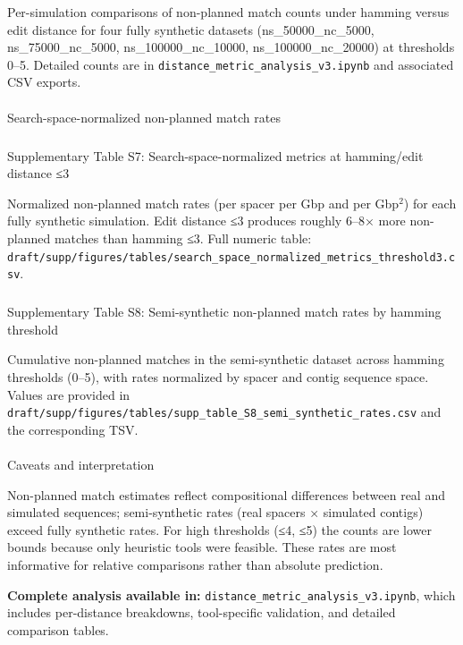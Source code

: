 \documentclass[
]{article}
\makeatletter
\let\oldparagraph\paragraph
\renewcommand{\paragraph}{
    \@ifstar
      \xxxParagraphStar
      \xxxParagraphNoStar
  }
\newcommand{\xxxParagraphStar}[1]{\oldparagraph*{#1}\mbox{}}
\newcommand{\xxxParagraphNoStar}[1]{\oldparagraph{#1}\mbox{}}
\let\oldsubparagraph\subparagraph
\renewcommand{\subparagraph}{
    \@ifstar
      \xxxSubParagraphStar
      \xxxSubParagraphNoStar
  }
\newcommand{\xxxSubParagraphStar}[1]{\oldsubparagraph*{#1}\mbox{}}
\newcommand{\xxxSubParagraphNoStar}[1]{\oldsubparagraph{#1}\mbox{}}
\makeatother
\begin{document}
Per-simulation comparisons of non-planned match counts under hamming
versus edit distance for four fully synthetic datasets
(ns\_50000\_nc\_5000, ns\_75000\_nc\_5000, ns\_100000\_nc\_10000,
ns\_100000\_nc\_20000) at thresholds 0--5. Detailed counts are in
\texttt{distance\_metric\_analysis\_v3.ipynb} and associated CSV
exports.

\paragraph{Search-space-normalized non-planned match
rates}\label{search-space-normalized-non-planned-match-rates}

\subparagraph{Supplementary Table S7: Search-space-normalized metrics at
hamming/edit distance ≤3}\label{tbl-supp-normalized-threshold3}

Normalized non-planned match rates (per spacer per Gbp and per
Gbp\(^2\)) for each fully synthetic simulation. Edit distance ≤3
produces roughly 6--8× more non-planned matches than hamming ≤3. Full
numeric table:
\texttt{draft/supp/figures/tables/search\_space\_normalized\_metrics\_threshold3.csv}.

\subparagraph{Supplementary Table S8: Semi-synthetic non-planned match
rates by hamming threshold}\label{tbl-supp-semisynthetic}

Cumulative non-planned matches in the semi-synthetic dataset across
hamming thresholds (0--5), with rates normalized by spacer and contig
sequence space. Values are provided in
\texttt{draft/supp/figures/tables/supp\_table\_S8\_semi\_synthetic\_rates.csv}
and the corresponding TSV.

\paragraph{Caveats and interpretation}\label{caveats-and-interpretation}

Non-planned match estimates reflect compositional differences between
real and simulated sequences; semi-synthetic rates (real spacers ×
simulated contigs) exceed fully synthetic rates. For high thresholds
(≤4, ≤5) the counts are lower bounds because only heuristic tools were
feasible. These rates are most informative for relative comparisons
rather than absolute prediction.

\textbf{Complete analysis available in:}
\texttt{distance\_metric\_analysis\_v3.ipynb}, which includes
per-distance breakdowns, tool-specific validation, and detailed
comparison tables.
\end{document}
